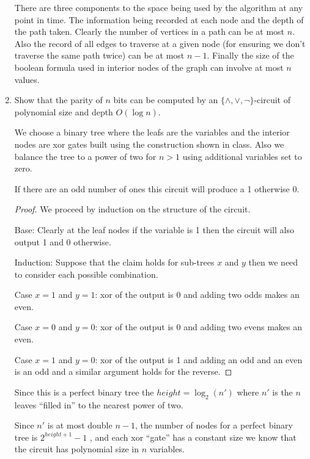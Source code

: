 \documentclass[usletter]{article}
\begin{document}
\begin{enumerate}
   There are three components to the space being used by the algorithm at any point in time. The information being recorded at each node and the depth of the path taken. Clearly the number of vertices in a path can be at most $n$. Also the record of all edges to traverse at a given node (for ensuring we don't traverse the same path twice) can be at most $n-1$. Finally the size of the boolean formula used in interior nodes of the graph can involve at most $n$ values.

 \item Show that the parity of $n$ bits can be computed by an $\{\land, \lor, \neg \}$-circuit of polynomial size and depth $O(\log n)$.

   We choose a binary tree where the leafs are the variables and the interior nodes are xor gates built using the construction shown in class. Also we balance the tree to a power of two for $n > 1$ using additional variables set to zero.

   \begin{claim}
     If there are an odd number of ones this circuit will produce a 1 otherwise 0.
   \end{claim}

   \begin{proof}
     We proceed by induction on the structure of the circuit.

     Base: Clearly at the leaf nodes if the variable is 1 then the circuit will also output 1 and 0 otherwise.

     Induction: Suppose that the claim holds for sub-trees $x$ and $y$ then we need to consider each possible combination.

     Case $x = 1$ and $y = 1$: xor of the output is 0 and adding two odds makes an even.

     Case $x = 0$ and $y = 0$: xor of the output is 0 and adding two evens makes an even.

     Case $x = 1$ and $y = 0$: xor of the output is 1 and adding an odd and an even is an odd and a similar argument holds for the reverse.
   \end{proof}

   Since this is a perfect binary tree the $height = \log_2 (n')$ where $n'$ is the $n$ leaves ``filled in'' to the nearest power of two.

   Since $n'$ is at most double $n-1$, the number of nodes for a perfect binary tree is $2^{height+1}-1$ \cite{wikipedia}, and each xor ``gate'' has a constant size we know that the circuit has polynomial size in $n$ variables.


\end{enumerate}
\end{document}
